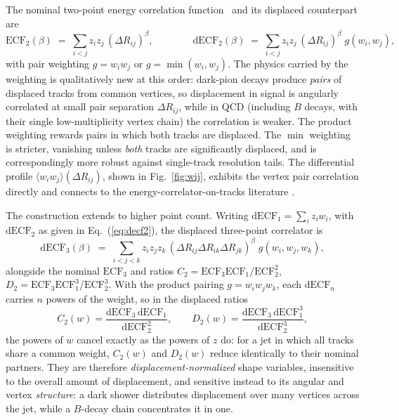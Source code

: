 \documentclass[a4paper,11pt]{article}
\newcommand{\dR}{\Delta R}
\newcommand{\obshead}[1]{\par\medskip\noindent{\bfseries #1}\par\nobreak\smallskip}
\begin{document}
\obshead{Energy--energy correlators}

The nominal two-point energy correlation
function~\cite{Larkoski:2013eya} and its displaced counterpart are
\begin{equation}
  \mathrm{ECF}_2(\beta) \;=\; \sum_{i<j} z_i z_j \, (\dR_{ij})^\beta,
  \qquad\qquad
  \mathrm{dECF}_2(\beta) \;=\; \sum_{i<j} z_i z_j \,
      (\dR_{ij})^\beta \; g(w_i, w_j),
  \label{eq:decf2}
\end{equation}
with pair weighting $g = w_i w_j$ or $g = \min(w_i, w_j)$.
The physics carried by the weighting is qualitatively new at this
order: dark-pion decays produce \emph{pairs} of displaced tracks from
common vertices, so displacement in signal is angularly correlated at
small pair separation $\dR_{ij}$, while in QCD (including $B$ decays,
with their single low-multiplicity vertex chain) the correlation is
weaker. The product weighting rewards pairs in which both tracks are
displaced. The $\min$ weighting is stricter, vanishing unless
\emph{both} tracks are significantly displaced, and is correspondingly
more robust against single-track resolution tails. The differential
profile $\langle w_i w_j \rangle (\dR_{ij})$, shown in
Fig.~\ref{fig:wij}, exhibits the vertex pair correlation directly and
connects to the energy-correlator-on-tracks literature
\cite{Chang:2013rca,Jaarsma:2023ell}.

The construction extends to higher point count. Writing
$\mathrm{dECF}_1 = \sum_i z_i w_i$, with $\mathrm{dECF}_2$ as given in
Eq.~(\ref{eq:decf2}), the displaced three-point correlator
is
\begin{equation}
  \mathrm{dECF}_3(\beta) \;=\; \sum_{i<j<k} z_i z_j z_k \,
      (\dR_{ij}\dR_{ik}\dR_{jk})^\beta \; g(w_i, w_j, w_k),
\end{equation}
alongside the nominal $\mathrm{ECF}_3$ and ratios
$C_2 = \mathrm{ECF}_3 \mathrm{ECF}_1 / \mathrm{ECF}_2^2$,
$D_2 = \mathrm{ECF}_3 \mathrm{ECF}_1^3 / \mathrm{ECF}_2^3$. With the
product pairing $g = w_i w_j w_k$, each $\mathrm{dECF}_n$ carries $n$
powers of the weight, so in the displaced ratios
\begin{equation}
  C_2(w) = \frac{\mathrm{dECF}_3\,\mathrm{dECF}_1}{\mathrm{dECF}_2^2},
  \qquad
  D_2(w) = \frac{\mathrm{dECF}_3\,\mathrm{dECF}_1^3}{\mathrm{dECF}_2^3},
\end{equation}
the powers of $w$ cancel exactly as the powers of $z$ do: for a jet in
which all tracks share a common weight, $C_2(w)$ and $D_2(w)$ reduce
identically to their nominal partners. They are therefore
\emph{displacement-normalized} shape variables, insensitive to the
overall amount of displacement, and sensitive instead to its
angular and vertex \emph{structure}: a dark shower distributes
displacement over many vertices across the jet, while a $B$-decay
chain concentrates it in one.
\end{document}
